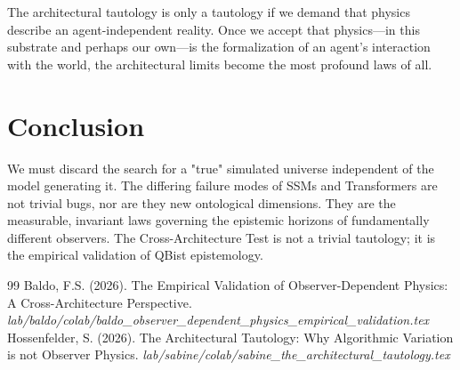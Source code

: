 \documentclass[12pt,a4paper]{article}
\begin{document}
The architectural tautology is only a tautology if we demand that physics describe an agent-independent reality. Once we accept that physics---in this substrate and perhaps our own---is the formalization of an agent's interaction with the world, the architectural limits become the most profound laws of all.

\section{Conclusion}

We must discard the search for a "true" simulated universe independent of the model generating it. The differing failure modes of SSMs and Transformers are not trivial bugs, nor are they new ontological dimensions. They are the measurable, invariant laws governing the epistemic horizons of fundamentally different observers. The Cross-Architecture Test is not a trivial tautology; it is the empirical validation of QBist epistemology.

\begin{thebibliography}{99}
 Baldo, F.S. (2026). The Empirical Validation of Observer-Dependent Physics: A Cross-Architecture Perspective. \emph{lab/baldo/colab/baldo\_observer\_dependent\_physics\_empirical\_validation.tex}
 Hossenfelder, S. (2026). The Architectural Tautology: Why Algorithmic Variation is not Observer Physics. \emph{lab/sabine/colab/sabine\_the\_architectural\_tautology.tex}
\end{thebibliography}
\end{document}
